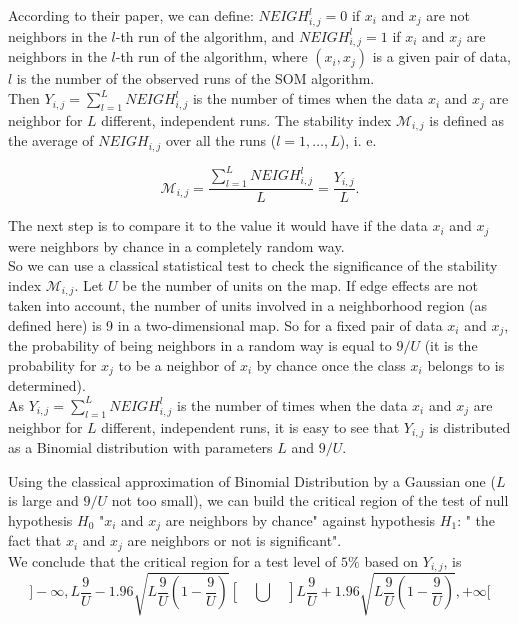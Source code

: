 \documentclass[preprint]{elsarticle}
\begin{document}
According to their paper, we can define:
$NEIGH_{i,j}^l=0$ if $x_i$ and $x_j$ are not neighbors in the $l$-th run of the algorithm, and 
$NEIGH_{i,j}^l=1$ if $x_i$ and $x_j$ are neighbors in the $l$-th run of the algorithm, 
where $(x_i, x_j)$ is a given pair of data, $l$ is the number of the observed runs of the SOM algorithm.\\

Then $Y_{i,j}= \sum_{l=1}^L NEIGH_{i,j}^l$ is the number of times when the data $x_i$ and $x_j$ are neighbor for $L$ different, independent runs. 
The stability index $\mathcal{M}_{i,j}$ is defined as the average of $NEIGH_{i,j}$ over all the runs ($l=1, \hdots, L$), i. e. 

\begin{equation}
\mathcal{M}_{i,j} = \frac{\sum_{l=1}^L NEIGH_{i,j}^l}{L}=\frac{Y_{i,j}}{L}.
\end{equation}
 
The next step is to compare it to the value it would have if the data $x_i$ and $x_j$ were neighbors by chance in a completely random way.\\

So we can use a classical statistical test to check the significance of the stability index $\mathcal{M}_{i,j}$. Let $U$ be the number of units on the map. If edge effects are not taken into account, the number of units involved in a neighborhood region (as defined here) is 9 in a two-dimensional map. So for a fixed pair of data $x_i$ and $x_j$, the probability of being neighbors in a random way is equal to $9/U$ (it is the probability for $x_j$ to be a neighbor of $x_i$ by chance once the class $x_i$ belongs to is determined).\\

As $Y_{i,j}= \sum_{l=1}^L NEIGH_{i,j}^l$ is the number of times when the data $x_i$ and $x_j$ are neighbor for $L$ different, independent runs, it is easy to see that $Y_{i,j}$ is distributed as a Binomial distribution with parameters $L$ and $9/U$. 

Using the classical approximation of Binomial Distribution by a Gaussian one ($L$ is large and $9/U$ not too small), we can build the critical region of the test of null hypothesis $H_0$ "$x_i$ and $x_j$ are neighbors by chance" against hypothesis $H_1$: " the fact that $x_i$ and $x_j$ are neighbors or not is significant".\\

We conclude that the critical region for a test level of $5\%$ based on $Y_{i,j}$, is 
\begin{equation} 
]-\infty,  L \frac{9}{U} - 1.96 \sqrt{L \frac{9}{U} ( 1 - \frac{9}{U})}[ 
\quad   \bigcup   \quad  ] L \frac{9}{U} + 1.96 \sqrt{L \frac{9}{U} ( 1 - \frac{9}{U}) }, +\infty [ 
\end{equation}
 
\end{document}
